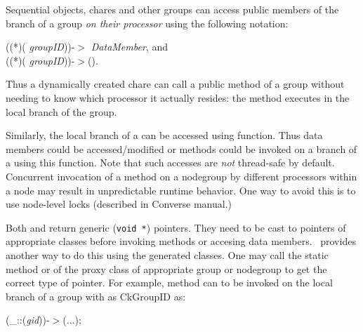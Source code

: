 Sequential objects, chares and other groups can access public members of the
branch of a group  {\it on their processor} using
the following notation:

((*)( {\it groupID}))-$>${\it
DataMember}, and \\ ((*)( {\it
groupID}))-$>$().  

Thus a dynamically created chare can call a public method of a
group without needing to know which processor it actually resides: the method
executes in the local branch of the group. 

Similarly, the local branch of a 
can be accessed using 
function. Thus data members could be accessed/modified or methods could be
invoked on a branch of a  using this function. Note
that such accesses are {\em not} thread-safe by default. Concurrent invocation
of a method on a nodegroup by different processors within a
node may result in unpredictable runtime behavior.  One way to avoid this is to
use node-level locks (described in Converse manual.)

Both  and 
 return generic ({\tt void *}) pointers. They need to be
cast to pointers of appropriate classes before invoking methods or accesing
data members. \charmpp\ provides another way to do this using the generated
 classes. One may call the static method
 or  of the proxy class of appropriate
group or nodegroup to get the correct type of pointer.  For
example, method  can to be invoked on the local branch of
a group  with  as CkGroupID as:

(\_::({\it gid}))-$>$(...);\\









